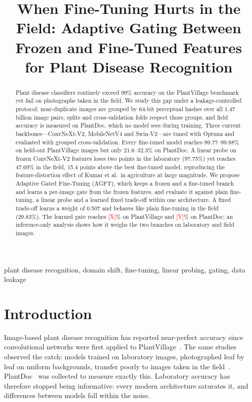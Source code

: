 \documentclass[conference]{IEEEtran}
\newcommand{\pending}[1]{\textcolor{red}{[#1]}}
\begin{document}
\title{When Fine-Tuning Hurts in the Field: Adaptive Gating Between Frozen and Fine-Tuned Features for Plant Disease Recognition}

\author{
}

\maketitle

\begin{abstract}
Plant disease classifiers routinely exceed 99\% accuracy on the PlantVillage benchmark yet fail on photographs taken in the field. We study this gap under a leakage-controlled protocol: near-duplicate images are grouped by 64-bit perceptual hashes over all 1.47 billion image pairs, splits and cross-validation folds respect those groups, and field accuracy is measured on PlantDoc, which no model sees during training. Three current backbones---ConvNeXt-V2, MobileNetV4 and Swin-V2---are tuned with Optuna and evaluated with grouped cross-validation. Every fine-tuned model reaches 99.77--99.88\% on held-out PlantVillage images but only 21.6--32.3\% on PlantDoc. A linear probe on frozen ConvNeXt-V2 features loses two points in the laboratory (97.75\%) yet reaches 47.69\% in the field, 15.4 points above the best fine-tuned model, reproducing the feature-distortion effect of Kumar et al.\ in agriculture at large magnitude. We propose Adaptive Gated Fine-Tuning (AGFT), which keeps a frozen and a fine-tuned branch and learns a per-image gate from the frozen features, and evaluate it against plain fine-tuning, a linear probe and a learned fixed trade-off within one architecture. A fixed trade-off learns a weight of 0.507 and behaves like plain fine-tuning in the field (29.83\%). The learned gate reaches \pending{X}\% on PlantVillage and \pending{Y}\% on PlantDoc; an inference-only analysis shows how it weighs the two branches on laboratory and field images.
\end{abstract}

\begin{IEEEkeywords}
plant disease recognition, domain shift, fine-tuning, linear probing, gating, data leakage
\end{IEEEkeywords}

\section{Introduction}
Image-based plant disease recognition has reported near-perfect accuracy since convolutional networks were first applied to PlantVillage~\cite{hughes2015plantvillage,mohanty2016using}. The same studies observed the catch: models trained on laboratory images, photographed leaf by leaf on uniform backgrounds, transfer poorly to images taken in the field~\cite{mohanty2016using,ferentinos2018deep}. PlantDoc~\cite{singh2020plantdoc} was collected to measure exactly this. Laboratory accuracy has therefore stopped being informative: every modern architecture saturates it, and differences between models fall within the noise.
\end{document}
